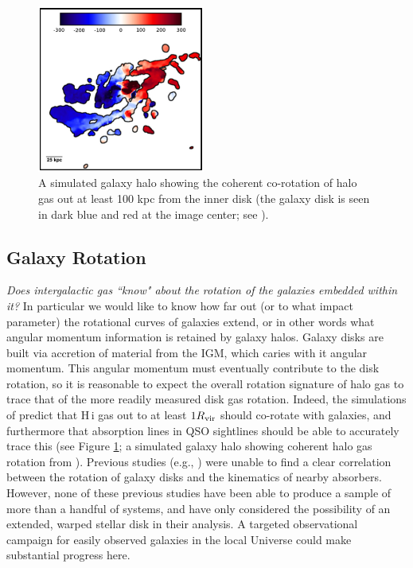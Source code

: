 \documentclass[twocolumn,tighten]{aastex62}
\newcommand{\HI}{\mbox{H\,{\sc i}} }
\newcommand{\II}{\,{\sc ii}}
\newcommand{\VI}{\,{\sc vi}}
\begin{document}


\begin{figure}[b!]
        \centering
        \vspace{0pt}
        \includegraphics[width=0.49\textwidth]{stewart2011_comoving_gas.jpg}
        \caption{\small{A simulated galaxy halo showing the coherent co-rotation of halo gas out at least 100 kpc from the inner disk (the galaxy disk is seen in dark blue and red at the image center; see \cite{stewart2011a}).}}
        \vspace{5pt}
        \label{stewart_rotation}
\end{figure}

\subsection{Galaxy Rotation}
\emph{Does intergalactic gas ``know" about the rotation of the galaxies embedded within it?} In particular we would like to know how far out (or to what impact parameter) the rotational curves of galaxies extend, or in other words what angular momentum information is retained by galaxy halos. Galaxy disks are built via accretion of material from the IGM, which caries with it angular momentum. This angular momentum must eventually contribute to the disk rotation, so it is reasonable to expect the overall rotation signature of halo gas to trace that of the more readily measured disk gas rotation. Indeed, the simulations of \cite{stewart2011a, stewart2011b, stewart2013} predict that \HI gas out to at least $1 R_{\rm vir}$ should co-rotate with galaxies, and furthermore that absorption lines in QSO sightlines should be able to accurately trace this (see Figure \ref{stewart_rotation}; a simulated galaxy halo showing coherent halo gas rotation from \citealt{stewart2011a}). Previous studies (e.g., \citealt{steidel2002, cote2005, wakker2009, kacprzak2011_kinematics}) were unable to find a clear correlation between the rotation of galaxy disks and the kinematics of nearby absorbers. However, none of these previous studies have been able to produce a sample of more than a handful of systems, and have only considered the possibility of an extended, warped stellar disk in their analysis. A targeted observational campaign for easily observed galaxies in the local Universe could make substantial progress here.
\end{document}
